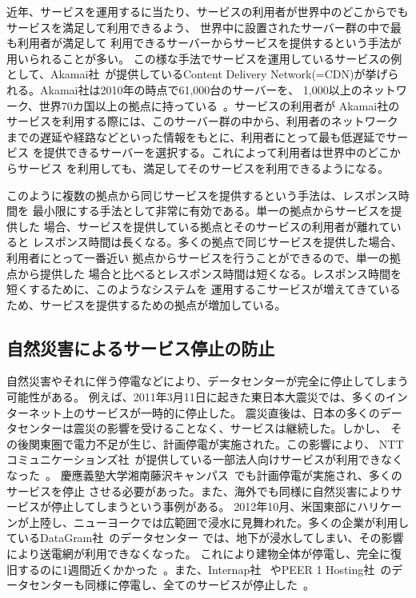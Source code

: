近年、サービスを運用するに当たり、サービスの利用者が世界中のどこからでもサービスを満足して利用できるよう、
世界中に設置されたサーバー群の中で最も利用者が満足して
利用できるサーバーからサービスを提供するという手法が用いられることが多い。
この様な手法でサービスを運用しているサービスの例として、Akamai社~\cite{akamai}が提供しているContent Delivery
Network(=CDN)が挙げられる。Akamai社は2010年の時点で61,000台のサーバーを、
1,000以上のネットワーク、世界70カ国以上の拠点に持っている~\cite{acm:sigops}。サービスの利用者が
Akamai社のサービスを利用する際には、このサーバー群の中から、利用者のネットワーク
までの遅延や経路などといった情報をもとに、利用者にとって最も低遅延でサービス
を提供できるサーバーを選択する。これによって利用者は世界中のどこからサービス
を利用しても、満足してそのサービスを利用できるようになる。

このように複数の拠点から同じサービスを提供するという手法は、レスポンス時間を
最小限にする手法として非常に有効である。単一の拠点からサービスを提供した
場合、サービスを提供している拠点とそのサービスの利用者が離れていると
レスポンス時間は長くなる。多くの拠点で同じサービスを提供した場合、利用者にとって一番近い
拠点からサービスを行うことができるので、単一の拠点から提供した
場合と比べるとレスポンス時間は短くなる。レスポンス時間を短くするために、このようなシステムを
運用するこサービスが増えてきているため、サービスを提供するための拠点が増加している。

\subsection{自然災害によるサービス停止の防止}
\label{background:ml2}

自然災害やそれに伴う停電などにより、データセンターが完全に停止してしまう可能性がある。
例えば、2011年3月11日に起きた東日本大震災では、多くのインターネット上のサービスが一時的に停止した。
震災直後は、日本の多くのデータセンターは震災の影響を受けることなく、サービスは継続した。しかし、
その後関東圏で電力不足が生じ、計画停電が実施された。この影響により、
NTTコミュニケーションズ社~\cite{nttcom}が提供している一部法人向けサービスが利用できなくなった~\cite{nttpress}。
慶應義塾大学湘南藤沢キャンパス~\cite{keiosfc}でも計画停電が実施され、多くのサービスを停止
させる必要があった。また、海外でも同様に自然災害によりサービスが停止してしまうという事例がある。
2012年10月、米国東部にハリケーンが上陸し、ニューヨークでは広範囲で浸水に見舞われた。多くの企業が利用しているDataGram社~\cite{datagram}のデータセンター
では、地下が浸水してしまい、その影響により送電網が利用できなくなった。
これにより建物全体が停電し、完全に復旧するのに1週間近くかかった~\cite{datagramdown}。また、Internap社~\cite{internap}
やPEER 1 Hosting社~\cite{peer1}のデータセンターも同様に停電し、全てのサービスが停止した~\cite{nycdown}。

